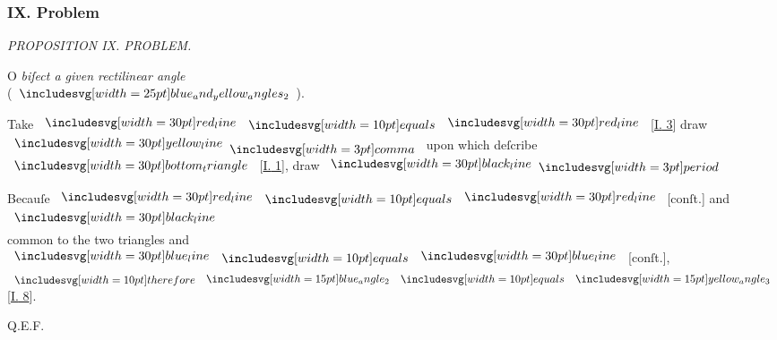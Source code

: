 \documentclass[11pt,preview]{standalone}
\begin{document}
\subsubsection{IX. Problem}

\begin{minipage}[t]{0.55\textwidth}
    \begin{center}
        \textit{PROPOSITION IX. PROBLEM.}\label{book1pr9} \\
    \end{center}

    \hfill

    \begin{center}
        \raggedright \lettrine[lines=3, loversize=1, nindent=0pt]{}{}O \textit{biſect a given rectilinear angle}\\ (\hspace{-1ex}$\img{blue_and_yellow_angles_2}$\hspace{-1ex}).
    \end{center}
\end{minipage}%
\hfill
\begin{minipage}[t]{0.43\textwidth}
    \vspace{20pt}
    
\end{minipage}

\hfill

{\vspace{1ex}\begin{center}
        Take $\redline \bequals \redline$ [\hyperref[book1pr3]{\textsc{I.} 3}] draw $\yellowline \bcomma$ upon which deſcribe $\img[0][0][30]{bottom_triangle}$ [\hyperref[book1pr1]{\textsc{I.} 1}], draw $\blackline \bperiod$
    \end{center}}

\hfill

\begin{center}
    Becauſe $\redline \bequals \redline$ [conſt.] and $\blackline$\\
    common to the two triangles and $\blueline \bequals \blueline$ [conſt.],\\
    $\btherefore \img[0][0][15]{blue_angle_2} \bequals \img[0][0][15]{yellow_angle_3}$ [\hyperref[book1pr8]{\textsc{I.} 8}].
\end{center}

\hfill

\hfill Q.E.F.
\end{document}
